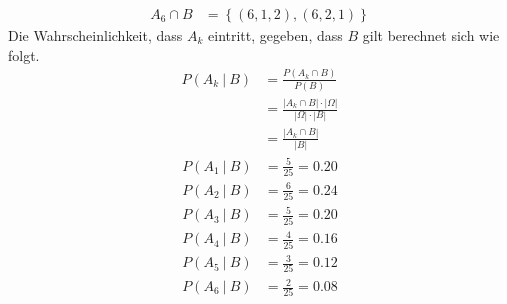 \documentclass[a4paper]{scrartcl}
\begin{document}
\begin{enumerate}[label=\bfseries\arabic*.]
\begin{align*}
            A_6 \cap B &= \left\{ (6, 1, 2), (6, 2, 1) \right\}
        \end{align*}
        Die Wahrscheinlichkeit, dass $A_k$ eintritt, gegeben, dass $B$ gilt
        berechnet sich wie folgt.
        \begin{equation*}
            \begin{split}
                P(A_k\ |\ B) &= \frac{P(A_k \cap B)}{P(B)} \\
                &= \frac{|A_k \cap B| \cdot |\Omega|}{|\Omega| \cdot |B|} \\
                &= \frac{|A_k \cap B|}{|B|}
            \end{split}
        \end{equation*}
        \begin{align*}
            P(A_1\ |\ B) &= \frac{5}{25} = \num{0,20} \\
            P(A_2\ |\ B) &= \frac{6}{25} = \num{0,24} \\
            P(A_3\ |\ B) &= \frac{5}{25} = \num{0,20} \\
            P(A_4\ |\ B) &= \frac{4}{25} = \num{0,16} \\
            P(A_5\ |\ B) &= \frac{3}{25} = \num{0,12} \\
            P(A_6\ |\ B) &= \frac{2}{25} = \num{0,08} \\
        \end{align*}


\end{enumerate}
\end{document}
